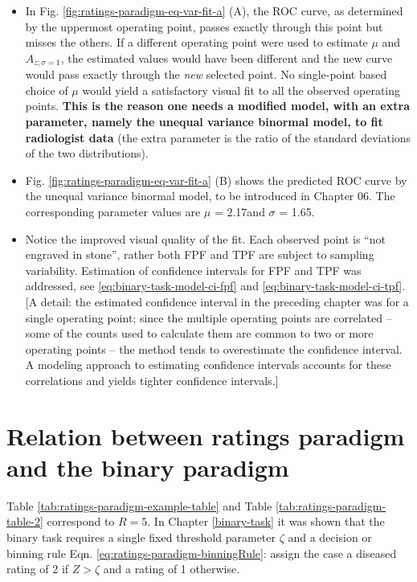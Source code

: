 \documentclass[
]{book}
\begin{document}
\begin{itemize}
\item
  In Fig. \ref{fig:ratings-paradigm-eq-var-fit-a} (A), the ROC curve, as determined by the uppermost operating point, passes exactly through this point but misses the others. If a different operating point were used to estimate \(\mu\) and \(A_{z;\sigma = 1}\), the estimated values would have been different and the new curve would pass exactly through the \emph{new} selected point. No single-point based choice of \(\mu\) would yield a satisfactory visual fit to all the observed operating points. \textbf{This is the reason one needs a modified model, with an extra parameter, namely the unequal variance binormal model, to fit radiologist data} (the extra parameter is the ratio of the standard deviations of the two distributions).
\item
  Fig. \ref{fig:ratings-paradigm-eq-var-fit-a} (B) shows the predicted ROC curve by the unequal variance binormal model, to be introduced in Chapter 06. The corresponding parameter values are \(\mu\) = 2.17and \(\sigma\) = 1.65.
\item
  Notice the improved visual quality of the fit. Each observed point is ``not engraved in stone'', rather both FPF and TPF are subject to sampling variability. Estimation of confidence intervals for FPF and TPF was addressed, see \eqref{eq:binary-task-model-ci-fpf} and \eqref{eq:binary-task-model-ci-tpf}. {[}A detail: the estimated confidence interval in the preceding chapter was for a single operating point; since the multiple operating points are correlated -- some of the counts used to calculate them are common to two or more operating points -- the method tends to overestimate the confidence interval. A modeling approach to estimating confidence intervals accounts for these correlations and yields tighter confidence intervals.{]}
\end{itemize}

\hypertarget{ratings-task-relation-binary-to-rating}{%
\section{Relation between ratings paradigm and the binary paradigm}\label{ratings-task-relation-binary-to-rating}}

Table \ref{tab:ratings-paradigm-example-table} and Table \ref{tab:ratings-paradigm-table-2} correspond to \(R = 5\). In Chapter \ref{binary-task} it was shown that the binary task requires a single fixed threshold parameter \(\zeta\) and a decision or binning rule Eqn. \eqref{eq:ratings-paradigm-binningRule}: assign the case a diseased rating of 2 if \(Z > \zeta\) and a rating of 1 otherwise.
\end{document}
